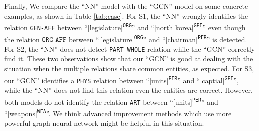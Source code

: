 



Finally,
We compare the ``NN'' model with the ``GCN'' model
on some concrete examples, as shown in Table \ref{tab:case}.
For S1,
the ``NN'' wrongly identifies the relation \texttt{GEN-AFF} between 
``[legislature]\textsuperscript{\texttt{ORG}}'' and
``[north korea]\textsuperscript{\texttt{GPE}}''
even though the relation $\texttt{ORG-AFF}$ between 
``[legislature]\textsuperscript{\texttt{ORG}}'' and
``[chairman]\textsuperscript{\texttt{PER}}'' is detected.
For S2,
the ``NN'' does not detect \texttt{PART-WHOLE} relation 
while the ``GCN'' correctly find it.
These two observations show that our ``GCN'' is good at 
dealing with the situation 
when the multiple relations share common entities, as expected.
For S3,
our ``GCN'' identifies a \texttt{PHYS} relation between
``[units]\textsuperscript{\texttt{PER}}'' and
``[captial]\textsuperscript{\texttt{GPE}}'',
while the ``NN'' does not find this relation 
even the entities are correct.
However, both models do not identify the relation \texttt{ART} between
``[units]\textsuperscript{\texttt{PER}}'' and
``[weapons]\textsuperscript{\texttt{WEA}}''.
We think advanced improvement methods
which use more powerful graph neural network might be helpful
in this situation.


